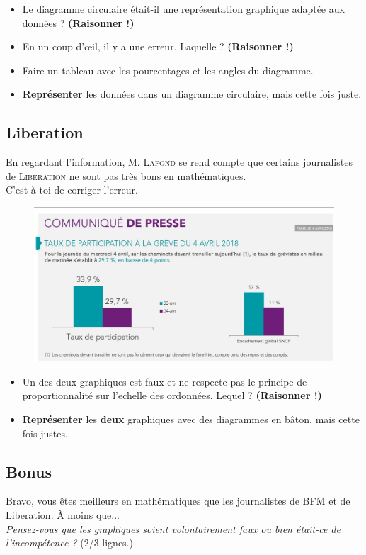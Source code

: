 \documentclass[12pt]{article}
\begin{document}
\begin{itemize}
	\item[1.] Le diagramme circulaire était-il une représentation graphique adaptée aux données ? \textbf{(Raisonner !)}
	\item[2.] En un coup d'œil, il y a une erreur. Laquelle ? \textbf{(Raisonner !)}
	\item[3.] Faire un tableau avec les pourcentages et les angles du diagramme.
	\item[4.] \textbf{Représenter} les données dans un diagramme circulaire, mais cette fois juste.
\end{itemize}	

\subsection*{Liberation}

\begin{multicols}{2}

En regardant l'information, \textsc{M. Lafond} se rend compte que certains journalistes de \textsc{Liberation} ne sont pas très bons en mathématiques.\\
C'est à toi de corriger l'erreur. 

\begin{figure}[H]
	\centering
	\includegraphics[width=\linewidth]{3x1-statistiques/sources/liberation.jpg}
\end{figure}

\end{multicols}

\begin{itemize}
	\item[1.] Un des deux graphiques est faux et ne respecte pas le principe de proportionnalité sur l'echelle des ordonnées. Lequel ? \textbf{(Raisonner !)}
	\item[2.] \textbf{Représenter} les \textbf{deux} graphiques avec des diagrammes en bâton, mais cette fois justes.
\end{itemize}	

\subsection*{Bonus}

Bravo, vous êtes meilleurs en mathématiques que les journalistes de BFM et de Liberation. À moins que... \\
\textit{Pensez-vous que les graphiques soient volontairement faux ou bien était-ce de l'incompétence ?} (2/3 lignes.)
\end{document}
